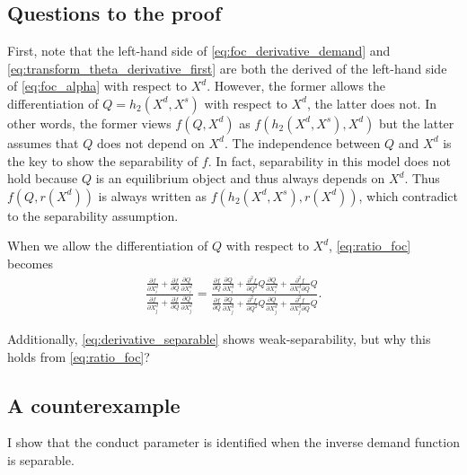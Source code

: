 \documentclass[11pt, a4paper]{article}
\theoremstyle{remark}
\begin{document}
\subsection{Questions to the proof}
First, note that the left-hand side of \eqref{eq:foc_derivative_demand} and \eqref{eq:transform_theta_derivative_first} are both the derived of the left-hand side of \eqref{eq:foc_alpha} with respect to $X^{d}$.
However, the former allows the differentiation of $Q = h_2(X^{d}, X^{s})$ with respect to $X^{d}$, the latter does not.
In other words, the former views $f(Q, X^{d})$ as $f(h_2(X^{d}, X^{s}), X^{d})$ but the latter assumes that $Q$ does not depend on $X^{d}$.
The independence between $Q$ and $X^{d}$ is the key to show the separability of $f$.
In fact, separability in this model does not hold because $Q$ is an equilibrium object and thus always depends on $X^{d}$. 
Thus $f(Q, r(X^{d}))$ is always written as $f(h_2(X^{d}, X^{s}), r(X^{d}))$, which contradict to the separability assumption.

When we allow the differentiation of $Q$ with respect to $X^{d}$, \eqref{eq:ratio_foc} becomes
\begin{align}
    \frac{\frac{\partial f}{\partial X^{d}_{i}} + \frac{\partial f}{\partial Q} \frac{\partial Q}{\partial X^{d}_{i}}}{\frac{\partial f}{\partial X^{d}_{j}} + \frac{\partial f}{\partial Q} \frac{\partial Q}{\partial X^{d}_{j}}} = \frac{\frac{\partial f}{\partial Q}\frac{\partial Q}{\partial X^{d}_{i}}  + \frac{\partial^2 f}{\partial Q^2}Q\frac{\partial Q}{\partial X^{d}_{i}} + \frac{\partial^2 f}{\partial X^{d}_{i}\partial Q}Q }{\frac{\partial f}{\partial Q}\frac{\partial Q}{\partial X^{d}_{j}}  + \frac{\partial^2 f}{\partial Q^2}Q\frac{\partial Q}{\partial X^{d}_{j}} + \frac{\partial^2 f}{\partial X^{d}_{j}\partial Q}Q }.
\end{align}

Additionally, \eqref{eq:derivative_separable} shows weak-separability, but why this holds from \eqref{eq:ratio_foc}?

\subsection{A counterexample}

I show that the conduct parameter is identified when the inverse demand function is separable. 
\end{document}

